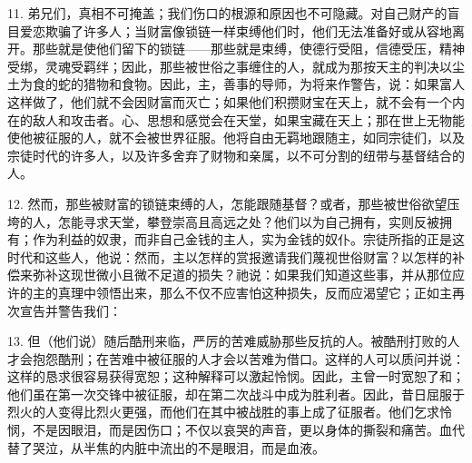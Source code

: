 11. 弟兄们，真相不可掩盖；我们伤口的根源和原因也不可隐藏。\newline{}对自己财产的盲目爱恋欺骗了许多人；当财富像锁链一样束缚他们时，他们无法准备好或从容地离开。\newline{}那些就是使他们留下的锁链——那些就是束缚，使德行受阻，信德受压，精神受绑，灵魂受羁绊；因此，那些被世俗之事缠住的人，就成为那按天主的判决以尘土为食的蛇的猎物和食物。\newline{}因此，主，善事的导师，为将来作警告，说：\newline{}如果富人这样做了，他们就不会因财富而灭亡；如果他们积攒财宝在天上，就不会有一个内在的敌人和攻击者。\newline{}心、思想和感觉会在天堂，如果宝藏在天上；那在世上无物能使他被征服的人，就不会被世界征服。\newline{}他将自由无羁地跟随主，如同宗徒们，以及宗徒时代的许多人，以及许多舍弃了财物和亲属，以不可分割的纽带与基督结合的人。\par

12. 然而，那些被财富的锁链束缚的人，怎能跟随基督？或者，那些被世俗欲望压垮的人，怎能寻求天堂，攀登崇高且高远之处？他们以为自己拥有，实则反被拥有；作为利益的奴隶，而非自己金钱的主人，实为金钱的奴仆。宗徒所指的正是这时代和这些人，他说：然而，主以怎样的赏报邀请我们蔑视世俗财富？以怎样的补偿来弥补这现世微小且微不足道的损失？祂说：如果我们知道这些事，并从那位应许的主的真理中领悟出来，那么不仅不应害怕这种损失，反而应渴望它；正如主再次宣告并警告我们：\par

13. 但（他们说）随后酷刑来临，严厉的苦难威胁那些反抗的人。被酷刑打败的人才会抱怨酷刑；在苦难中被征服的人才会以苦难为借口。这样的人可以质问并说：这样的恳求很容易获得宽恕；这种解释可以激起怜悯。因此，主曾一时宽恕了和；他们虽在第一次交锋中被征服，却在第二次战斗中成为胜利者。因此，昔日屈服于烈火的人变得比烈火更强，而他们在其中被战胜的事上成了征服者。他们乞求怜悯，不是因眼泪，而是因伤口；不仅以哀哭的声音，更以身体的撕裂和痛苦。血代替了哭泣，从半焦的内脏中流出的不是眼泪，而是血液。\par

